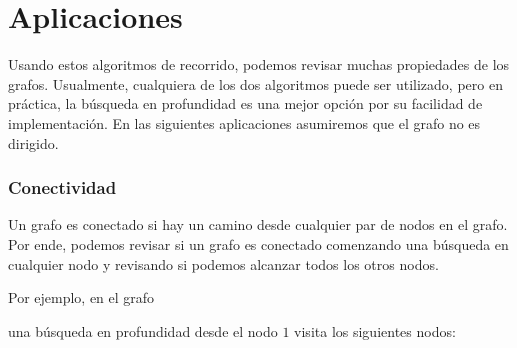 \section{Aplicaciones}

Usando estos algoritmos de recorrido, podemos
revisar muchas propiedades de los grafos. Usualmente, cualquiera
de los dos algoritmos puede ser utilizado, pero en práctica, la
búsqueda en profundidad es una mejor opción por su facilidad de
implementación. En las siguientes aplicaciones asumiremos que el
grafo no es dirigido.

\subsubsection{Conectividad}


Un grafo es conectado si hay un camino desde cualquier
par de nodos en el grafo. Por ende, podemos revisar si un grafo
es conectado comenzando una búsqueda en cualquier nodo y revisando
si podemos alcanzar todos los otros nodos.

Por ejemplo, en el grafo
\begin{center}
\end{center}
una búsqueda en profundidad desde el nodo $1$ visita
los siguientes nodos:
\begin{center}
\end{center}

